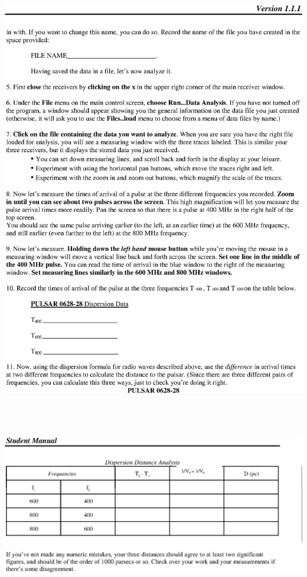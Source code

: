 \includegraphics[height=8in,trim=-2.2in -3.3in  0 1.3in]{wordtops/pulsar11.eps}
\vfil\eject

\includegraphics[trim=-2.2in -7in 0 7in]{wordtops/pulsar12.eps}
\vfil\eject
